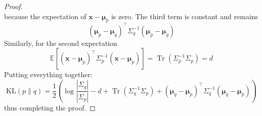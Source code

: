 \begin{proof}
\[    \]
    because the expectation of $\mathbf{x}-\boldsymbol{\mu}_p$ is zero. The third term is constant and remains
    \[
    (\boldsymbol{\mu}_p - \boldsymbol{\mu}_q)^\top \Sigma_q^{-1} (\boldsymbol{\mu}_p - \boldsymbol{\mu}_q)
    \]
    Similarly, for the second expectation
    \[
    \mathbb{E}\left[ (\mathbf{x} - \boldsymbol{\mu}_p)^\top \Sigma_p^{-1} (\mathbf{x} - \boldsymbol{\mu}_p) \right] = \operatorname{Tr}(\Sigma_p^{-1} \Sigma_p) = d
    \]
    Putting everything together:
    \[
    \mathrm{KL}(p\|q) = \frac{1}{2} \left( \log\frac{|\Sigma_q|}{|\Sigma_p|} - d + \operatorname{Tr}(\Sigma_q^{-1}\Sigma_p) + (\boldsymbol{\mu}_q - \boldsymbol{\mu}_p)^\top \Sigma_q^{-1} (\boldsymbol{\mu}_q - \boldsymbol{\mu}_p) \right)
    \]
    thus completing the proof.
\end{proof}